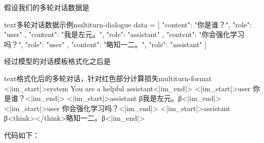 \documentclass[lang=cn,newtx,10pt,scheme=chinese]{elegantbook}
\begin{document}
假设我们的多轮对话数据是

\begin{codebox}{text}{多轮对话数据示例}{multiturn-dialogue}
data = [
    {
        "content": "你是谁？",
        "role": "user"
    },
    {
        "content": "我是左元。",
        "role": "assistant"
    },
    {
        "content": "你会强化学习吗？",
        "role": "user"
    },
    {
        "content": "略知一二。",
        "role": "assistant"
    }
]
\end{codebox}

经过模型的对话模板格式化之后是

\begin{codebox}{text}{格式化后的多轮对话，针对红色部分计算损失}{multiturn-format}
<|im_start|>system
You are a helpful assistant<|im_end|>
<|im_start|>user
你是谁？<|im_end|>
<|im_start|>assistant
β{\color{red}我是左元。}β<|im_end|>
<|im_start|>user
你会强化学习吗？<|im_end|>
<|im_start|>assistant
β{\color{red}<think></think>略知一二。}β<|im_end|>
\end{codebox}

代码如下：
\end{document}
